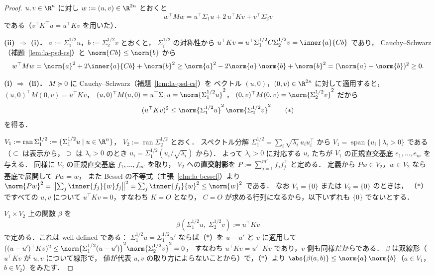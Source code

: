 \begin{proof}
  $u,v\in\R^n$ に対し $w:=(u,v)\in\R^{2n}$ とおくと
  \[
    w^\top Mw
    =u^\top\Sigma_1u+2\,u^\top Kv+v^\top\Sigma_2v
  \]
  である（$v^\top K^\top u=u^\top Kv$ を用いた）．

  \textbf{(ii) $\Rightarrow$ (i)．}
  $a:=\Sigma_1^{1/2}u$，$b:=\Sigma_2^{1/2}v$ とおくと，
  $\Sigma_i^{1/2}$ の対称性から
  $u^\top Kv=u^\top\Sigma_1^{1/2}C\Sigma_2^{1/2}v=\inner{a}{Cb}$ であり，
  Cauchy--Schwarz（補題~\ref{lem:la-psd-cs}）と
  $\norm{Cb}\leq\norm{b}$ から
  \[
    w^\top Mw
    =\norm{a}^2+2\inner{a}{Cb}+\norm{b}^2
    \geq\norm{a}^2-2\norm{a}\,\norm{b}+\norm{b}^2
    =(\norm{a}-\norm{b})^2
    \geq0.
  \]

  \textbf{(i) $\Rightarrow$ (ii)．}
  $M\succeq0$ に Cauchy--Schwarz（補題~\ref{lem:la-psd-cs}）を
  ベクトル $(u,0)$，$(0,v)\in\R^{2n}$ に対して適用すると，
  $(u,0)^\top M(0,v)=u^\top Kv$，
  $(u,0)^\top M(u,0)=u^\top\Sigma_1u=\norm{\Sigma_1^{1/2}u}^2$，
  $(0,v)^\top M(0,v)=\norm{\Sigma_2^{1/2}v}^2$ だから
  \[
    (u^\top Kv)^2
    \leq
    \norm{\Sigma_1^{1/2}u}^2\,\norm{\Sigma_2^{1/2}v}^2
    \tag{$*$}
  \]
  を得る．

  $V_1:=\operatorname{ran}\Sigma_1^{1/2}:=\{\Sigma_1^{1/2}u\mid u\in\R^n\}$，
  $V_2:=\operatorname{ran}\Sigma_2^{1/2}$ とおく．
  スペクトル分解 $\Sigma_1^{1/2}=\sum_i\sqrt{\lambda_i}\,u_iu_i^\top$ から
  $V_1=\operatorname{span}\{u_i\mid\lambda_i>0\}$ である
  （$\subset$ は表示から，$\supset$ は $\lambda_i>0$ のとき
  $u_i=\Sigma_1^{1/2}(u_i/\sqrt{\lambda_i})$ から）．
  よって $\lambda_i>0$ に対応する $u_i$ たちが
  $V_1$ の正規直交基底 $e_1,\dots,e_m$ を与える．
  同様に $V_2$ の正規直交基底 $f_1,\dots,f_{m'}$ を取り，
  $V_2$ への\textbf{直交射影}を $P:=\sum_{j=1}^{m'}f_jf_j^\top$ と定める．
  定義から $Pw\in V_2$，$w\in V_2$ なら基底で展開して $Pw=w$，
  また Bessel の不等式（主張~\ref{clm:la-bessel}）より
  $\norm{Pw}^2=\bigl\lVert\sum_j\inner{f_j}{w}f_j\bigr\rVert^2
  =\sum_j\inner{f_j}{w}^2\leq\norm{w}^2$ である．
  なお $V_1=\{0\}$ または $V_2=\{0\}$ のときは，
  （$*$）ですべての $u,v$ について $u^\top Kv=0$，すなわち $K=O$ となり，
  $C=O$ が求める行列になるから，以下いずれも $\{0\}$ でないとする．

  $V_1\times V_2$ 上の関数 $\beta$ を
  \[
    \beta(\Sigma_1^{1/2}u,\;\Sigma_2^{1/2}v):=u^\top Kv
  \]
  で定める．これは well-defined である：
  $\Sigma_1^{1/2}u=\Sigma_1^{1/2}u'$ ならば（$*$）を $u-u'$ と $v$ に適用して
  $((u-u')^\top Kv)^2\leq\norm{\Sigma_1^{1/2}(u-u')}^2\norm{\Sigma_2^{1/2}v}^2=0$，
  すなわち $u^\top Kv=u'^\top Kv$ であり，$v$ 側も同様だからである．
  $\beta$ は双線形（$u^\top Kv$ が $u,v$ について線形で，
  値が代表 $u,v$ の取り方によらないことから）で，（$*$）より
  $\abs{\beta(a,b)}\leq\norm{a}\,\norm{b}$（$a\in V_1$，$b\in V_2$）をみたす．


\end{proof}
